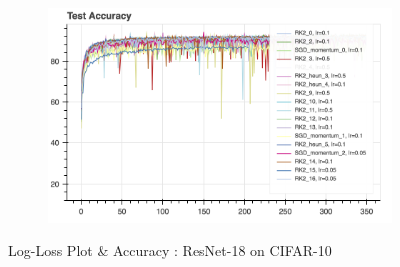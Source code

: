 \begin{figure}[htb]
\begin{subfigure}{0.5\textwidth}
\end{subfigure}
\begin{subfigure}{0.5\textwidth}
\includegraphics[scale=0.45]{plots/res_cifar_4.png}
\end{subfigure}


\caption{Log-Loss Plot \& Accuracy : ResNet-18 on CIFAR-10}
\end{figure}






